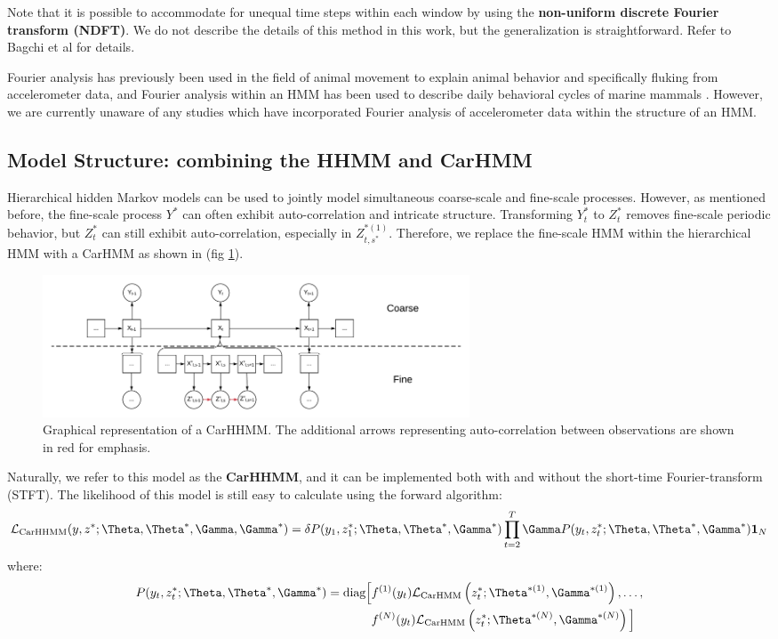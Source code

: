 Note that it is possible to accommodate for unequal time steps within each window by using the \textbf{non-uniform discrete Fourier transform (NDFT)}. We do not describe the details of this method in this work, but the generalization is straightforward. Refer to Bagchi et al \cite{Bagchi:2001} for details.

Fourier analysis has previously been used in the field of animal movement to explain animal behavior \cite{Fehlmann:2017} and specifically fluking \cite{Shorter:2017} from accelerometer data, and Fourier analysis within an HMM has been used to describe daily behavioral cycles of marine mammals  \cite{Heerah:2017}. However, we are currently unaware of any studies which have incorporated Fourier analysis of accelerometer data within the structure of an HMM.

\subsection{Model Structure: combining the HHMM and CarHMM}
\label{subsec:model_structure}

Hierarchical hidden Markov models can be used to jointly model simultaneous coarse-scale and fine-scale processes. However, as mentioned before, the fine-scale process $Y^*$ can often exhibit auto-correlation and intricate structure. Transforming $Y^*_t$ to $Z^*_t$ removes fine-scale periodic behavior, but $Z^*_t$ can still exhibit auto-correlation, especially in $Z_{t,s^*}^{*(1)}$. Therefore, we replace the fine-scale HMM within the hierarchical HMM with a CarHMM as shown in (fig \ref{fig:CarHHMM}).
%
\begin{figure}[h!]
	\centering
	\includegraphics[width=5in]{../Plots/CarHHMM.png}
	\caption{Graphical representation of a CarHHMM. The additional arrows representing auto-correlation between observations are shown in red for emphasis.}
	\label{fig:CarHHMM}
\end{figure}
%
Naturally, we refer to this model as the \textbf{CarHHMM}, and it can be implemented both with and without the short-time Fourier-transform (STFT). The likelihood of this model is still easy to calculate using the forward algorithm:
%
$$\calL_{\text{CarHHMM}}(y,z^*;\Theta,\Theta^*,\Gamma,\Gamma^*) = \delta P(y_1,z_1^*;\Theta,\Theta^*,\Gamma^*) \prod_{t=2}^T \Gamma P(y_t,z_t^*;\Theta,\Theta^*,\Gamma^*) \mathbf{1}_N$$
%
where:
%
\begin{align*}
P(y_t,z_t^*;\Theta,\Theta^*,\Gamma^*)  = \text{diag}\Big[&f^{(1)}(y_t)\calL_{\text{CarHMM}}\left(z_t^*;\Theta^{*(1)},\Gamma^{*(1)}\right), \ldots , \\
&f^{(N)}(y_t)\calL_{\text{CarHMM}}\left(z_t^*;\Theta^{*(N)},\Gamma^{*(N)}\right) \Big]
\end{align*}
%